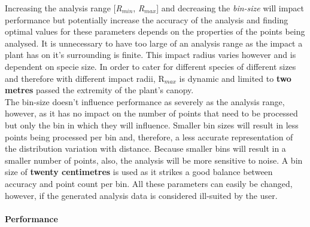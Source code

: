 Increasing the analysis range [\textit{R$_{min}$}, \textit{R$_{max}$}] and decreasing the \textit{bin-size} will impact performance but potentially increase the accuracy of the analysis and finding optimal values for these parameters depends on the properties of the points being analysed. It is unnecessary to have too large of an analysis range as the impact a plant has on it's surrounding is finite. This impact radius varies however and is dependent on specie size. In order to cater for different species of different sizes and therefore with different impact radii, R$_{max}$ is dynamic and limited to \textbf{two metres} passed the extremity of the plant's canopy.\\
The bin-size doesn't influence performance as severely as the analysis range, however, as it has no impact on the number of points that need to be processed but only the bin in which they will influence. Smaller bin sizes will result in less points being processed per bin and, therefore, a less accurate representation of the distribution variation with distance. Because smaller bins will result in a smaller number of points, also, the analysis will be more sensitive to noise. A bin size of \textbf{twenty centimetres} is used as it strikes a good balance between accuracy and point count per bin. All these parameters can easily be changed, however, if the generated analysis data is considered ill-suited by the user. \\

\paragraph{Performance}

